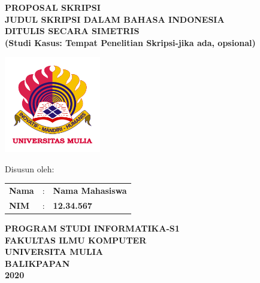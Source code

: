 \documentclass[oneside,listof=totoc]{scrbook}
\newcommand{\JudulProposal}{JUDUL SKRIPSI DALAM BAHASA INDONESIA \\ DITULIS SECARA SIMETRIS}
\newcommand{\NamaMahasiswa}{Nama Mahasiswa}
\newcommand{\NIM}{12.34.567}
\newcommand{\TahunPembuatan}{2020}
\begin{document}
\frontmatter
\pagestyle{plain}

\clearpage
\thispagestyle{empty}

\begin{center}
  \normalsize{\textbf{PROPOSAL SKRIPSI}\\
  \vspace{1.0cm}
  \textbf{\JudulProposal}}\\
  \textbf{(Studi Kasus: Tempat Penelitian Skripsi-jika ada, opsional)}
\end{center}

\vspace{3.0cm}

\begin{minipage}{12.2cm}
  \centering
    \includegraphics[width=4.20cm]{gambar/logo_um}
\end{minipage}

\vspace{2.5cm}

\begin{center}
  \normalsize{Disusun oleh:}\\
  \vspace{0.2cm}
  \begin{minipage}{\textwidth}
    \begin{center}
      \begin{tabular}{l r l}
        \textbf{Nama} & : & \textbf{\NamaMahasiswa}\\
        \textbf{NIM}  & : & \textbf{\NIM}
      \end{tabular}
    \end{center}
  \end{minipage}
\end{center}

\vspace{3.0cm}

\begin{center}
  \normalsize{\textbf{PROGRAM STUDI INFORMATIKA-S1}}\\
  \normalsize{\textbf{FAKULTAS ILMU KOMPUTER}}\\
  \normalsize{\textbf{UNIVERSITA MULIA}}\\
  \normalsize{\textbf{BALIKPAPAN}}\\
  \normalsize{\textbf{\TahunPembuatan}}
\end{center}
\end{document}
